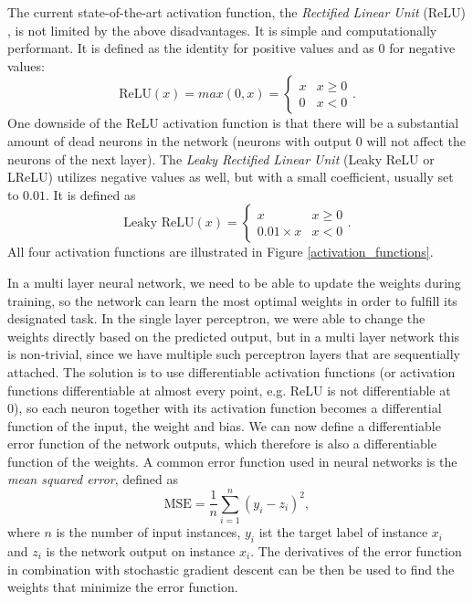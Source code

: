The current state-of-the-art activation function, the \textit{Rectified Linear Unit} (ReLU) \cite{activation_functions}, is not limited by the above disadvantages. It is simple and computationally performant. It is defined as the identity for positive values and as 0 for negative values:
$$\text{ReLU}(x) = max(0, x) = 
\begin{cases}
    x & x \geq 0\\
    0 & x < 0
\end{cases}.
$$
One downside of the ReLU activation function is that there will be a substantial amount of dead neurons in the network (neurons with output 0 will not affect the neurons of the next layer). The \textit{Leaky Rectified Linear Unit} (Leaky ReLU or LReLU) \cite{activation_functions} utilizes negative values as well, but with a small coefficient, usually set to $0.01$. It is defined as
$$\text{Leaky ReLU}(x) = 
\begin{cases}
    x & x \geq 0\\
    0.01 \times x & x < 0
\end{cases}.
$$
All four activation functions are illustrated in Figure \ref{activation_functions}.

In a multi layer neural network, we need to be able to update the weights during training, so the network can learn the most optimal weights in order to fulfill its designated task. In the single layer perceptron, we were able to change the weights directly based on the predicted output, but in a multi layer network this is non-trivial, since we have multiple such perceptron layers that are sequentially attached. The solution is to use differentiable activation functions (or activation functions differentiable at almost every point, e.g. ReLU is not differentiable at 0), so each neuron together with its activation function becomes a differential function of the input, the weight and bias. We can now define a differentiable error function of the network outputs, which therefore is also a differentiable function of the weights. A common error function used in neural networks is the \textit{mean squared error}, defined as
$$\text{MSE} = \frac{1}{n} \sum^n_{i=1}{(y_i - z_i)^2},$$
where $n$ is the number of input instances, $y_i$ ist the target label of instance $x_i$ and $z_i$ is the network output on instance $x_i$. The derivatives of the error function in combination with stochastic gradient descent can be then be used to find the weights that minimize the error function. \cite{neural_networks_pattern_recognition}

